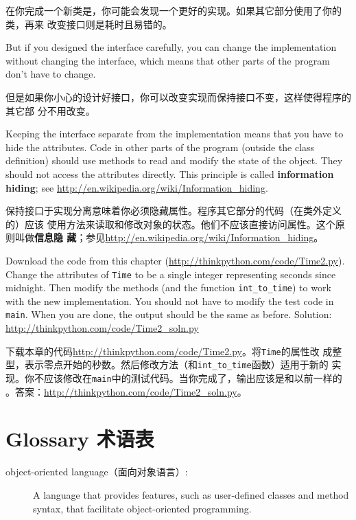 \documentclass[10pt]{book}
\begin{document}
\begin{CJK}{UTF8}{gbsn}
在你完成一个新类是，你可能会发现一个更好的实现。如果其它部分使用了你的类，再来
改变接口则是耗时且易错的。

But if you designed the interface carefully, you can
change the implementation without changing the interface, which
means that other parts of the program don't have to change.

但是如果你小心的设计好接口，你可以改变实现而保持接口不变，这样使得程序的其它部
分不用改变。

Keeping the interface separate from the implementation means that
you have to hide the attributes.  Code in other parts of the program
(outside the class definition) should use methods to read
and modify the state of the object.  They should not access the
attributes directly.  This principle is called {\bf information hiding};
see \url{http://en.wikipedia.org/wiki/Information_hiding}.

保持接口于实现分离意味着你必须隐藏属性。程序其它部分的代码（在类外定义的）应该
使用方法来读取和修改对象的状态。他们不应该直接访问属性。这个原则叫做{\bf 信息隐
藏}；参见\url{http://en.wikipedia.org/wiki/Information_hiding}。


\begin{exercise}

Download the code from this chapter
(\url{http://thinkpython.com/code/Time2.py}).  Change the attributes
of {\tt Time} to be a single integer representing seconds since
midnight.  Then modify the methods (and the function
\verb"int_to_time") to work with the new implementation.  You should
not have to modify the test code in {\tt main}.  When you are done,
the output should be the same as before.  Solution:
\url{http://thinkpython.com/code/Time2_soln.py}

下载本章的代码\url{http://thinkpython.com/code/Time2.py}。将{\tt Time}的属性改
成整型，表示零点开始的秒数。然后修改方法（和\verb"int_to_time"函数）适用于新的
实现。你不应该修改在{\tt main}中的测试代码。当你完成了，输出应该是和以前一样的
。答案：\url{http://thinkpython.com/code/Time2_soln.py}。


\end{exercise}


\section{Glossary 术语表}

\begin{description}

\item[object-oriented language（面向对象语言）:] A language that provides features,
  such as user-defined classes and method syntax, that facilitate
  object-oriented programming.


\end{description}
\end{CJK}
\end{document}
